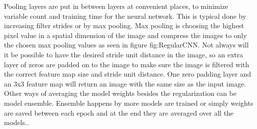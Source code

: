 \FloatBarrier

Pooling layers are put in between layers at convenient places, to minimize variable count and training time for the neural network. This is typical done by increasing filter strides or by max pooling. Max pooling is choosing the highest pixel value in a spatial dimension of the image and compress the images to only the chosen max pooling values as seen in figure fig:RegularCNN. Not always will it be possible to have the desired stride unit distance in the image, so an extra layer of zeros are padded on to the image to make sure the image is filtered with the correct feature map size and stride unit distance. One zero padding layer and an 3x3 feature map will return an image with the same size as the input image. Other ways of averaging the model weights besides the regularization can be model ensemble. Ensemble happens by more models are trained or simply weights are saved between each epoch and at the end they are averaged over all the models..   

\FloatBarrier

